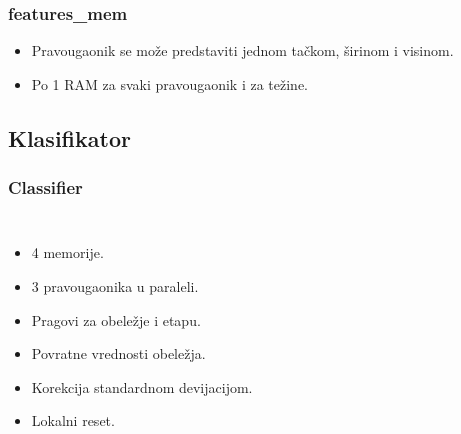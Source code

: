 \documentclass{beamer}
\begin{document}
\begin{frame}
  \frametitle<1-1>{features\_mem}

  \begin{itemize}
  \item<1-2> Pravougaonik se može predstaviti jednom tačkom, širinom i visinom.
  \item<2-2> Po 1 RAM za svaki pravougaonik i za težine.

  \end{itemize}

  \begin{figure}[H]
  \end{figure}
\end{frame}

\subsection{Klasifikator}

\begin{frame}
  \frametitle<1-1>{Classifier}

  \begin{columns}[onlytextwidth,T]
    \column{\dimexpr\linewidth-76mm-1mm}
    \begin{itemize}
    \item<1-> 4 memorije.
    \item<1-> 3 pravougaonika u paraleli.
    \item<1-> Pragovi za obeležje i etapu.
    \item<1-> Povratne vrednosti obeležja.
    \item<1-> Korekcija standardnom devijacijom.
    \item<1-> Lokalni reset.
    \end{itemize}


    \column{80mm}
      \begin{figure}[H]
        \resizebox{0.92\textwidth}{!}{%
          
          }
        \end{figure}

  \end{columns}
\end{frame}

\AtBeginSubsection[]
\end{document}
